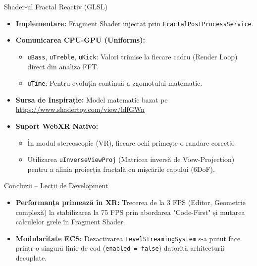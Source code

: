 \documentclass[11pt, aspectratio=169]{beamer}
\begin{document}
\begin{frame}{Shader-ul Fractal Reactiv (GLSL)}
    \begin{itemize}
        \item \textbf{Implementare:} Fragment Shader injectat prin \texttt{FractalPostProcessService}.
        \item \textbf{Comunicarea CPU-GPU (Uniforms):}
              \begin{itemize}
                  \item \texttt{uBass}, \texttt{uTreble}, \texttt{uKick}: Valori trimise la fiecare cadru (Render Loop) direct din analiza FFT.
                  \item \texttt{uTime}: Pentru evoluția continuă a zgomotului matematic.
              \end{itemize}
        \item \textbf{Sursa de Inspirație:} Model matematic bazat pe \url{https://www.shadertoy.com/view/ldfGWn}
        \item \textbf{Suport WebXR Nativo:}
              \begin{itemize}
                  \item În modul stereoscopic (VR), fiecare ochi primește o randare corectă.
                  \item Utilizarea \texttt{uInverseViewProj} (Matricea inversă de View-Projection) pentru a alinia proiecția fractală cu mișcările capului (6DoF).
              \end{itemize}
    \end{itemize}
\end{frame}

\begin{frame}{Concluzii – Lecții de Development}
    \begin{itemize}
        \item \textbf{Performanța primează în XR:} Trecerea de la 3 FPS (Editor, Geometrie complexă) la stabilizarea la 75 FPS prin abordarea "Code-First" și mutarea calculelor grele în Fragment Shader.
        \item \textbf{Modularitate ECS:} Dezactivarea \texttt{LevelStreamingSystem} s-a putut face printr-o singură linie de cod (\texttt{enabled = false}) datorită arhitecturii decuplate.
    \end{itemize}
\end{frame}
\end{document}
